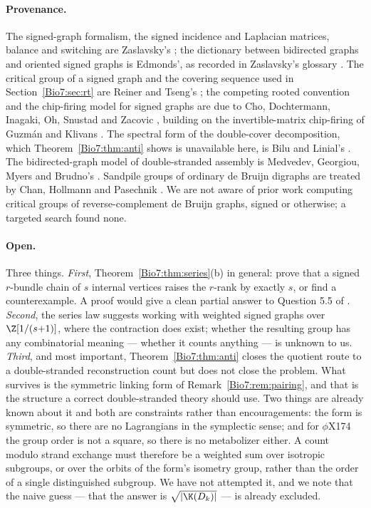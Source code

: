 \paragraph{Provenance.} The signed-graph formalism, the signed incidence and Laplacian
matrices, balance and switching are Zaslavsky's \cite{Zas82}; the dictionary between
bidirected graphs and oriented signed graphs is Edmonds', as recorded in Zaslavsky's glossary
\cite{Zas98}. The critical group of a signed graph and the covering sequence used in
Section~\ref{Bio7:sec:rt} are Reiner and Tseng's \cite{RT14}; the competing rooted convention and
the chip-firing model for signed graphs are due to Cho, Dochtermann, Inagaki, Oh, Snustad and
Zacovic \cite{CDIOSZ}, building on the invertible-matrix chip-firing of Guzm\'an and Klivans
\cite{GK16}. The spectral form of the double-cover decomposition, which
Theorem~\ref{Bio7:thm:anti} shows is unavailable here, is Bilu and Linial's \cite{BL06}. The
bidirected-graph model of double-stranded assembly is Medvedev, Georgiou, Myers and Brudno's
\cite{MGMB07}. Sandpile groups of ordinary de Bruijn digraphs are treated by Chan, Hollmann
and Pasechnik \cite{CHP15}. We are not aware of prior work computing critical groups of
reverse-complement de Bruijn graphs, signed or otherwise; a targeted search found none.

\paragraph{Open.} Three things.
\emph{First}, Theorem~\ref{Bio7:thm:series}(b) in general: prove that a signed $r$-bundle chain of
$s$ internal vertices raises the $r$-rank by exactly $s$, or find a counterexample. A proof
would give a clean partial answer to Question 5.5 of \cite{CDIOSZ}.
\emph{Second}, the series law suggests working with weighted signed graphs over
$\Z[1/(s{+}1)]$, where the contraction does exist; whether the resulting group has any
combinatorial meaning --- whether it counts anything --- is unknown to us.
\emph{Third}, and most important, Theorem~\ref{Bio7:thm:anti} closes the quotient route to a
double-stranded reconstruction count but does not close the problem. What survives is the
symmetric linking form of Remark~\ref{Bio7:rem:pairing}, and that is the structure a correct
double-stranded theory should use. Two things are already known about it and both are
constraints rather than encouragements: the form is symmetric, so there are no Lagrangians
in the symplectic sense; and for $\phi$X174 the group order is not a square, so there is no
metabolizer either. A count modulo strand exchange must therefore be a weighted sum over
isotropic subgroups, or over the orbits of the form's isometry group, rather than the order
of a single distinguished subgroup. We have not attempted it, and we note that the naive
guess --- that the answer is $\sqrt{|\K(D_k)|}$ --- is already excluded.
